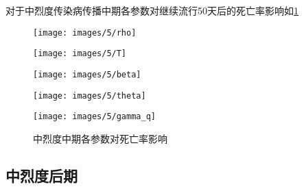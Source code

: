 \documentclass[withoutpreface,bwprint]{cumcmthesis}
\begin{document}
对于中烈度传染病传播中期各参数对继续流行50天后的死亡率影响如\cref{fig:10}
\begin{figure}[H]
    \centering
    \begin{minipage}[c]{0.3\textwidth}
        \centering
        \texttt{[image: images/5/rho]}
        \subcaption{$\rho$}
    \end{minipage}
    \begin{minipage}[c]{0.3\textwidth}
        \centering
        \texttt{[image: images/5/T]}
    \end{minipage}
    \begin{minipage}[c]{0.3\textwidth}
        \centering
        \texttt{[image: images/5/beta]}
        \subcaption{$\beta$}
    \end{minipage}

    \begin{minipage}[c]{0.3\textwidth}
        \centering
        \texttt{[image: images/5/theta]}
        \subcaption{$\theta$}
    \end{minipage}
    \begin{minipage}[c]{0.3\textwidth}
        \centering
        \texttt{[image: images/5/gamma\_q]}
    \end{minipage}
    \caption{中烈度中期各参数对死亡率影响}
    \label{fig:10}

\end{figure}

\subsection{中烈度后期}
\end{document}
